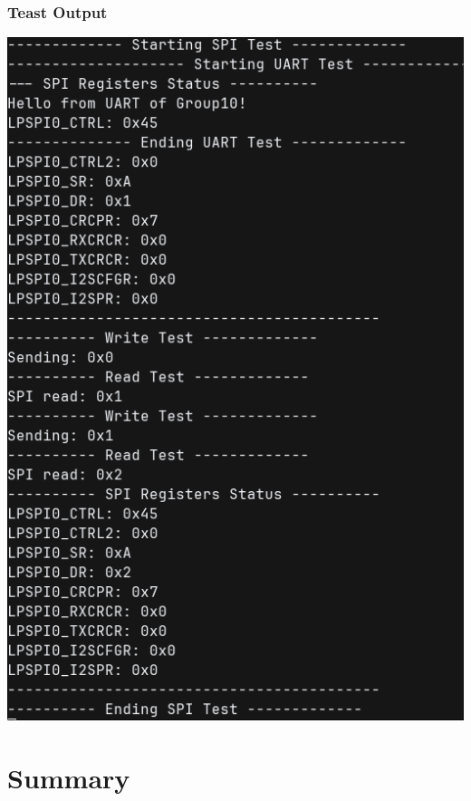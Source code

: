 \documentclass{beamer}
\begin{document}
\begin{frame}
\frametitle{Teast Output}
    \begin{center}
        \includegraphics[height=\textheight]{assets/test_output.png}
    \end{center}
\end{frame}

\section{Summary}
\end{document}
